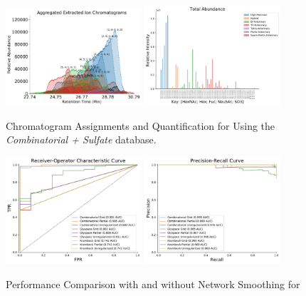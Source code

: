     \begin{figure}[tb]
        \caption{Chromatogram Assignments and Quantification
                 for \philbs Using the \textit{Combinatorial + Sulfate} database.
                 \label{fig:philbs_assignments}}
        \centering
        \includegraphics[width=0.45\textwidth,valign=t]{figure/sulfated_phil_bs_native_chromatograms.pdf}
        \includegraphics[width=0.45\textwidth,valign=t]{figure/sulfated_phil_bs_native_abundances.pdf}
    \end{figure}

    \begin{figure}[tb]
        \caption{Performance Comparison with and without Network Smoothing for \philbs
                 \label{fig:philbs_perf}}
        \centering
        \includegraphics[width=0.45\textwidth,valign=t]{figure/sulfated_phil_bs_native_roc.pdf}
        \includegraphics[width=0.45\textwidth,valign=t]{figure/sulfated_phil_bs_native_prec_rec.pdf}
    \end{figure}

